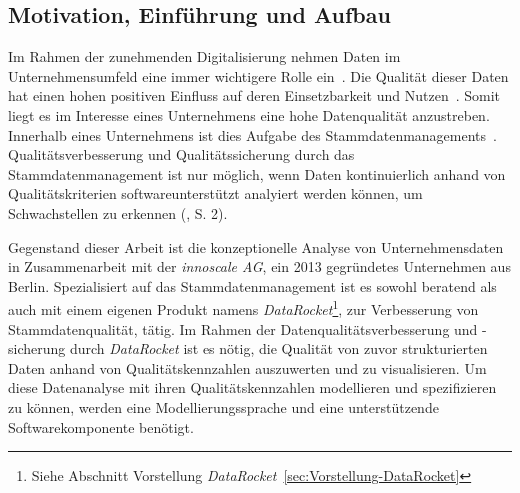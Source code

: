 \documentclass[
  language=german, %
  type=bachelor,%
  ngerman
]{isthesis}
\begin{document}
\begin{content}



  \chapter{Motivation, Einführung und Aufbau}\label{ch:einleitung}


	Im Rahmen der zunehmenden Digitalisierung nehmen Daten im Unternehmensumfeld
	eine immer wichtigere Rolle ein~\cite[][]{otto2016datenqualitat}. Die
	Qualität dieser Daten hat einen hohen positiven Einfluss auf deren
	Einsetzbarkeit und Nutzen~\cite[][]{naumann2007datenqualitat,
	helfert2000massnahmen}. Somit liegt es im Interesse eines Unternehmens eine
	hohe Datenqualität anzustreben. Innerhalb eines Unternehmens ist dies Aufgabe
	des Stammdatenmanagements~\cite[][]{legner2007stammdaten}.
	Qualitätsverbesserung und Qualitätssicherung durch das Stammdatenmanagement
	ist nur möglich, wenn Daten kontinuierlich anhand von Qualitätskriterien
	softwareunterstützt analyiert werden können, um Schwachstellen zu erkennen
	(\cite{baghi2013controlling}, S. 2).

  Gegenstand dieser Arbeit ist die konzeptionelle Analyse von Unternehmensdaten
  in Zusammenarbeit mit der \textit{innoscale AG}, ein 2013 gegründetes
  Unternehmen aus Berlin.  Spezialisiert auf das Stammdatenmanagement ist es
  sowohl beratend als auch mit einem eigenen Produkt namens
  \textit{DataRocket}\footnote{Siehe Abschnitt Vorstellung
  \textit{DataRocket}~\ref{sec:Vorstellung-DataRocket}}, zur Verbesserung von
  Stammdatenqualität, tätig. Im Rahmen der Datenqualitätsverbesserung und
  -sicherung durch \textit{DataRocket} ist es nötig, die Qualität von zuvor
  strukturierten Daten anhand von Qualitätskennzahlen auszuwerten und zu
  visualisieren. Um diese Datenanalyse mit ihren Qualitätskennzahlen
  modellieren und spezifizieren zu können, werden eine Modellierungssprache und
  eine unterstützende Softwarekomponente benötigt.


\end{content}
\end{document}
